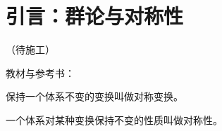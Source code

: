 \chapter{引言：群论与对称性}

（待施工）

教材与参考书：

\begin{definition}[对称变换]
    保持一个体系不变的变换叫做对称变换。
\end{definition}

\begin{definition}[对称性]
    一个体系对某种变换保持不变的性质叫做对称性。
\end{definition}